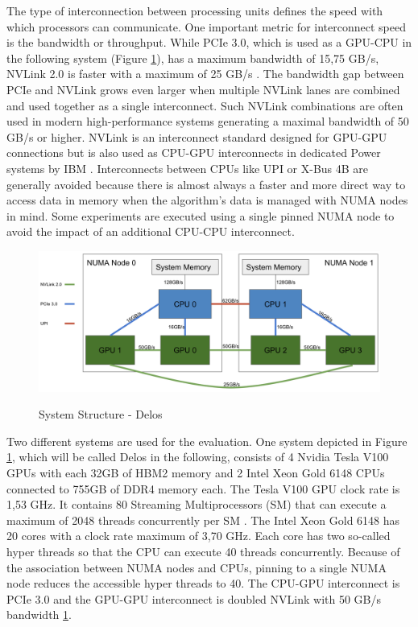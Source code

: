 The type of interconnection between processing units defines the speed with which processors can communicate. One important metric for interconnect speed is the bandwidth or throughput. While PCIe 3.0, which is used as a GPU-CPU in the following system (Figure \ref{fig:delos_arch}), has a maximum bandwidth of 15,75 GB/s, NVLink 2.0 is faster with a maximum of 25 GB/s \cite{zargesEvaluationOnNodeGPU}. The bandwidth gap between PCIe and NVLink grows even larger when multiple NVLink lanes are combined and used together as a single interconnect. Such NVLink combinations are often used in modern high-performance systems generating a maximal bandwidth of 50 GB/s or higher. NVLink is an interconnect standard designed for GPU-GPU connections but is also used as CPU-GPU interconnects in dedicated Power systems by IBM \cite{liEvaluatingModernGPU2020}. Interconnects between CPUs like UPI or X-Bus 4B are generally avoided because there is almost always a faster and more direct way to access data in memory when the algorithm's data is managed with NUMA nodes in mind. Some experiments are executed using a single pinned NUMA node to avoid the impact of an additional CPU-CPU interconnect.

\begin{figure}[H]
  \caption{System Structure - Delos}
  \includegraphics[width=\textwidth]{figures/delos_system_arch.png}
  \centering
  \label{fig:delos_arch}
\end{figure}

Two different systems are used for the evaluation. One system depicted in Figure \ref{fig:delos_arch}, which will be called Delos in the following, consists of 4 Nvidia Tesla V100 GPUs with each 32GB of HBM2 memory and 2 Intel Xeon Gold 6148 CPUs connected to 755GB of DDR4 memory each. The Tesla V100 GPU clock rate is 1,53 GHz. It contains 80 Streaming Multiprocessors (SM) that can execute a maximum of 2048 threads concurrently per SM \cite{NVIDIATESLAV1002017}. The Intel Xeon Gold 6148 has 20 cores with a clock rate maximum of 3,70 GHz. Each core has two so-called hyper threads so that the CPU can execute 40 threads concurrently. Because of the association between NUMA nodes and CPUs, pinning to a single NUMA node reduces the accessible hyper threads to 40. The CPU-GPU interconnect is PCIe 3.0 and the GPU-GPU interconnect is doubled NVLink with 50 GB/s bandwidth \ref{fig:delos_arch}.


